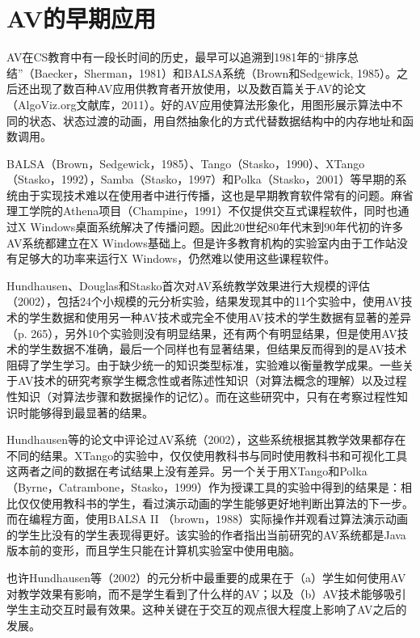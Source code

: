\chapter{AV的早期应用}
\begin{sectext}
AV在CS教育中有一段长时间的历史，最早可以追溯到1981年的``排序总结''（Baecker，Sherman，1981）和BALSA系统（Brown和Sedgewick, 1985）。之后还出现了数百种AV应用供教育者开放使用，以及数百篇关于AV的论文（AlgoViz.org文献库，2011）。好的AV应用使算法形象化，用图形展示算法中不同的状态、状态过渡的动画，用自然抽象化的方式代替数据结构中的内存地址和函数调用。

BALSA（Brown，Sedgewick，1985）、Tango（Stasko，1990）、XTango（Stasko，1992），Samba（Stasko，1997）和Polka（Stasko，2001）等早期的系统由于实现技术难以在使用者中进行传播，这也是早期教育软件常有的问题。麻省理工学院的Athena项目（Champine，1991）不仅提供交互式课程软件，同时也通过X Windows桌面系统解决了传播问题。因此20世纪80年代末到90年代初的许多AV系统都建立在X Windows基础上。但是许多教育机构的实验室内由于工作站没有足够大的功率来运行X Windows，仍然难以使用这些课程软件。

Hundhausen、Douglas和Stasko首次对AV系统教学效果进行大规模的评估（2002），包括24个小规模的元分析实验，结果发现其中的11个实验中，使用AV技术的学生数据和使用另一种AV技术或完全不使用AV技术的学生数据有显著的差异（p. 265），另外10个实验则没有明显结果，还有两个有明显结果，但是使用AV技术的学生数据不准确，最后一个同样也有显著结果，但结果反而得到的是AV技术阻碍了学生学习。由于缺少统一的知识类型标准，实验难以衡量教学成果。一些关于AV技术的研究考察学生概念性或者陈述性知识（对算法概念的理解）以及过程性知识（对算法步骤和数据操作的记忆）。而在这些研究中，只有在考察过程性知识时能够得到最显著的结果。

Hundhausen等的论文中评论过AV系统（2002），这些系统根据其教学效果都存在不同的结果。XTango的实验中，仅仅使用教科书与同时使用教科书和可视化工具这两者之间的数据在考试结果上没有差异。另一个关于用XTango和Polka（Byrne，Catrambone，Stasko，1999）作为授课工具的实验中得到的结果是：相比仅仅使用教科书的学生，看过演示动画的学生能够更好地判断出算法的下一步。而在编程方面，使用BALSA II （brown，1988）实际操作并观看过算法演示动画的学生比没有的学生表现得更好。该实验的作者指出当前研究的AV系统都是Java版本前的变形，而且学生只能在计算机实验室中使用电脑。

也许Hundhausen等（2002）的元分析中最重要的成果在于（a）学生如何使用AV对教学效果有影响，而不是学生看到了什么样的AV；以及（b）AV技术能够吸引学生主动交互时最有效果。这种关键在于交互的观点很大程度上影响了AV之后的发展。
\end{sectext}
